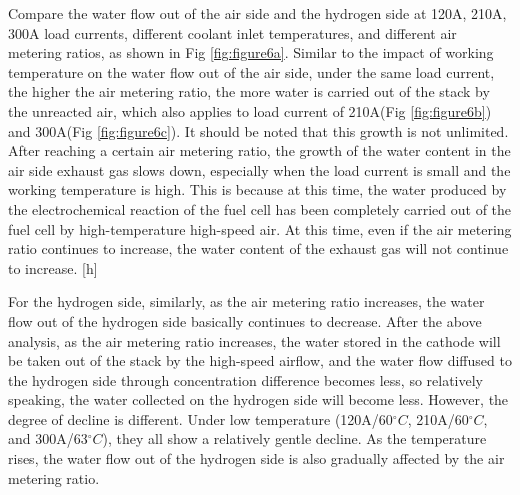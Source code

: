 Compare the water flow out of the air side and the hydrogen side at 120A, 210A, 300A load currents, different coolant inlet temperatures, and different air metering ratios, as shown in Fig \ref{fig:figure6a}. Similar to the impact of working temperature on the water flow out of the air side, under the same load current, the higher the air metering ratio, the more water is carried out of the stack by the unreacted air, which also applies to load current of 210A(Fig \ref{fig:figure6b}) and 300A(Fig \ref{fig:figure6c}). It should be noted that this growth is not unlimited. After reaching a certain air metering ratio, the growth of the water content in the air side exhaust gas slows down, especially when the load current is small and the working temperature is high. This is because at this time, the water produced by the electrochemical reaction of the fuel cell has been completely carried out of the fuel cell by high-temperature high-speed air. At this time, even if the air metering ratio continues to increase, the water content of the exhaust gas will not continue to increase.
[h]
\par
For the hydrogen side, similarly, as the air metering ratio increases, the water flow out of the hydrogen side basically continues to decrease. After the above analysis, as the air metering ratio increases, the water stored in the cathode will be taken out of the stack by the high-speed airflow, and the water flow diffused to the hydrogen side through concentration difference becomes less, so relatively speaking, the water collected on the hydrogen side will become less. However, the degree of decline is different. Under low temperature (120A/60$^{\circ}C$, 210A/60$^{\circ}C$, and 300A/63$^{\circ}C$), they all show a relatively gentle decline. As the temperature rises, the water flow out of the hydrogen side is also gradually affected by the air metering ratio.

